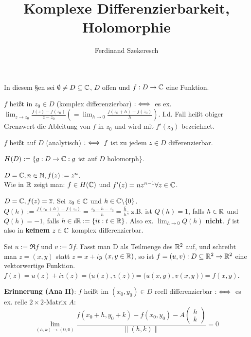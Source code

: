 \documentclass{article}
\title{Komplexe Differenzierbarkeit, Holomorphie}
\author{Ferdinand Szekeresch}
\def\gdw{\equizu}
\begin{document}
\maketitle

In diesem §en sei $\emptyset \neq D \subseteq \mathbb{C}$, $D$ offen und $f: D \rightarrow \mathbb{C}$ eine Funktion.

\begin{definition}
\begin{liste}
\item $f$ heißt in $z_0 \in D$  (komplex differenzierbar) $:\gdw$ es ex. $\lim_{z \rightarrow z_0} \frac{f(z) - f(z_0)}{z - z_0} (= \lim_{h \rightarrow 0} \frac{f(z_0 + h) - f(z_0)}{h})$. I.d. Fall heißt obiger Grenzwert die Ableitung von $f$ in $z_0$ und wird mit $f'(z_0)$ bezeichnet.
\item $f$ heißt auf $D$  (analytisch) $: \gdw f$ ist zu jedem $z \in D$ differenzierbar.
\item $H(D) := \{g : D \rightarrow \mathbb{C}: g$ ist auf $D$ holomorph$\}$.
\end{liste}
\end{definition}

\begin{beispiele}
\item $D = \mathbb{C}, n \in \mathbb{N}, f(z) := z^n$. \\
Wie in $\mathbb{R}$ zeigt man: $f \in H(\mathbb{C})$ und $f'(z) = nz^{n-1} \forall z \in \mathbb{C}$.
\item $D =  \mathbb{C}, f(z) = \overline{z}$. Sei $z_0 \in \mathbb{C}$ und $h \in \mathbb{C} \backslash\{0\}$. \\
$Q(h) := \frac{f(z_0 + h) - f(z_0)}{h} = \frac{\overline{z_0} + \overline{h} - \overline{z_0}}{h} = \frac{\overline{h}}{h}$; z.B. ist $Q(h) = 1$, falls $h \in \mathbb{R}$ und $Q(h) = -1$, falls $h \in i\mathbb{R} := \{it : t \in \mathbb{R}\}$. Also ex. $\lim_{h \rightarrow 0} Q(h)$ \textbf{nicht}. $f$ ist also in \textbf{keinem} $z \in \mathbb{C}$ komplex differenzierbar.
\end{beispiele}

Sei $u := \Re f$ und $v := \Im f$. Fasst man D als Teilmenge des $\mathbb{R} ^2$ auf, und schreibt man $z = (x,y)$ statt $z = x + iy $ $(x,y \in \mathbb{R})$, so ist $f = (u,v): D \subseteq \mathbb{R} ^2 \rightarrow \mathbb{R} ^2$ eine vektorwertige Funktion. \\
$f(z) = u(z) + iv(z) = \big(u(z),v(z)\big) = \big(u(x,y),v(x,y)\big) = f(x,y)$.

\textbf{Erinnerung (Ana II)}: $f$ heißt im $(x_0, y_0) \in D$ reell differenzierbar $:\gdw$ es ex. relle $2\times 2$-Matrix $A$: \\
$$\lim_{(h,k) \rightarrow (0,0)} \frac{f(x_0 + h,y_0 + k) - f(x_0,y_0) - A \begin{pmatrix}h\\k\end{pmatrix}}{\|(h,k)\|} = 0$$
\end{document}

